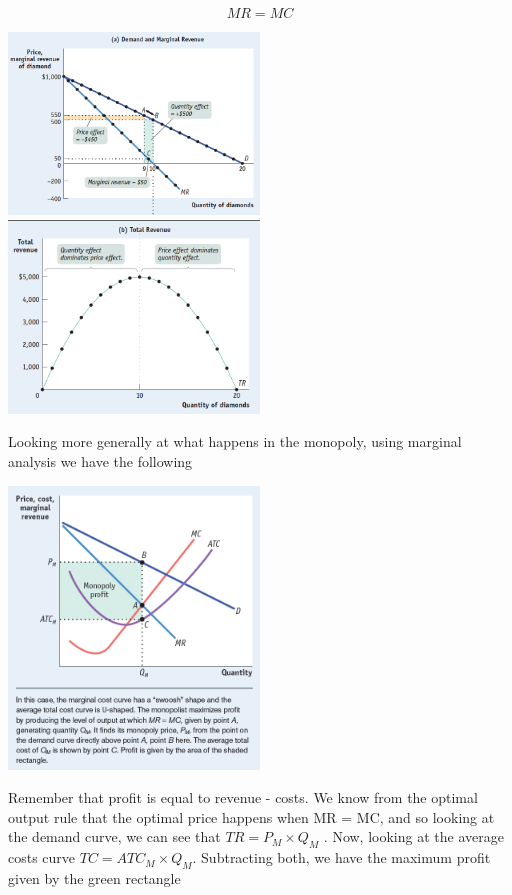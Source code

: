 \documentclass[english,course]{Notes}
\begin{document}
$$\boxed{MR = MC}$$


\includegraphics[width=0.5\textwidth, height=0.5\textwidth]{mon}
\includegraphics[width=0.5\textwidth, height=0.5\textwidth]{mon2}

\par{Looking more generally at what happens in the monopoly, using marginal analysis we have the following}

\includegraphics[width=0.5\textwidth, height=0.5\textwidth]{mon3}

\par{Remember that profit is equal to revenue - costs. We know from the optimal output rule that the optimal price happens when MR = MC, and so looking at the demand curve, we can see that $TR = P_{M} \times Q_{M}$ . Now, looking at the average costs curve $TC = ATC_{M} \times Q_{M}$. Subtracting both, we have the maximum profit given by the green rectangle}
\end{document}
